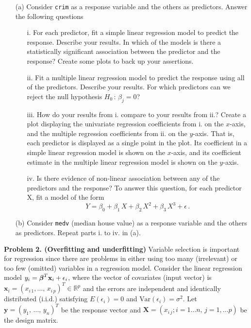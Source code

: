\documentclass[11pt]{report}
\newcommand{\bfmath}[1]{\mbox{\boldmath$#1$\unboldmath}}
\begin{document}
\begin{itemize}
\item[(a) ] Consider {\tt crim} as a response variable and the others as predictors. Answer the following questions
\begin{itemize}
\item[i. ] For each predictor, fit a simple linear regression model to predict the response. Describe your results. In which of the models is there a statistically significant association between the predictor and the response? Create some plots to back up your assertions. 
\item[ii. ] Fit a multiple linear regression model to predict the response using all of the predictors. Describe your results. For which predictors can we reject the null hypothesis $H_0\,:\, \beta_j=0$?
\item[iii. ]  How do your results from i. compare to your results from ii.? Create a plot displaying the univariate regression coefficients from i. on the $x$-axis, and the multiple regression coefficients from ii. on the $y$-axis. That is, each predictor is displayed as a single point in the plot. Its coefficient in a simple linear regression model is shown on the $x$-axis, and its coefficient estimate in the multiple linear regression model is shown on the $y$-axis.
\item[iv. ] Is there evidence of non-linear association between any of the predictors and the response? To answer this question, for each predictor X, fit a model of the form
$$Y=\beta_0+\beta_1\,X+\beta_2\,X^2+\beta_3\,X^3+\epsilon\,.$$
\end{itemize}
\item[(b) ] Consider {\tt medv} (median house value) as a response variable and the others as predictors. Repeat parts i. to iv. in (a). \end{itemize}

\noindent
{\bf Problem 2. (Overfitting and underfitting)} Variable selection is important for regression since there are problems in either using too many (irrelevant) or too few (omitted) variables in a regression model. Consider the linear regression model $y_i=\bfmath{\beta}^T\mathbf{x}_i+\epsilon_i$, where the vector of covariates (input vector) is $\mathbf{x}_i=(x_{i\,1},\dots,\,x_{i\,p})^T\in\mathbb{R}^p$ and the errors are independent and identically distributed (i.i.d.) satisfying $E(\epsilon_i)=0$ and $\text{Var}(\epsilon_i)=\sigma^2$. Let $\mathbf{y}=(y_1,\,\dots,\,y_n)^T$ be the response vector and $\mathbf{X}=(x_{i\,j}; i=1\dots n, \,j=1,\dots p)$ be the design matrix. 
\end{document}
